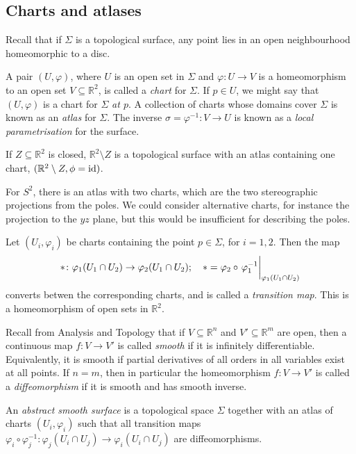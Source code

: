 \subsection{Charts and atlases}
Recall that if \( \Sigma \) is a topological surface, any point lies in an open neighbourhood homeomorphic to a disc.
\begin{definition}
	A pair \( (U, \varphi) \), where \( U \) is an open set in \( \Sigma \) and \( \varphi \colon U \to V \) is a homeomorphism to an open set \( V \subseteq \mathbb R^2 \), is called a \textit{chart} for \( \Sigma \).
	If \( p \in U \), we might say that \( (U, \varphi) \) is a chart for \( \Sigma \) \textit{at \( p \)}.
	A collection of charts whose domains cover \( \Sigma \) is known as an \textit{atlas} for \( \Sigma \).
	The inverse \( \sigma = \varphi^{-1} \colon V \to U \) is known as a \textit{local parametrisation} for the surface.
\end{definition}
\begin{example}
	If \( Z \subseteq \mathbb R^2 \) is closed, \( \mathbb R^2 \setminus Z \) is a topological surface with an atlas containing one chart, \( (\mathbb R^2 \setminus Z, \phi = \operatorname{id}) \).

	For \( S^2 \), there is an atlas with two charts, which are the two stereographic projections from the poles.
	We could consider alternative charts, for instance the projection to the \( yz \) plane, but this would be insufficient for describing the poles.
\end{example}
\begin{definition}
	Let \( (U_i, \varphi_i) \) be charts containing the point \( p \in \Sigma \), for \( i = 1, 2 \).
	Then the map
	\[
		\ast \colon \varphi_1(U_1 \cap U_2) \to \varphi_2(U_1 \cap U_2);\quad \ast = \varphi_2 \circ \eval{\varphi_1^{-1}}_{\varphi_1(U_1 \cap U_2)}
	\]
	converts betwen the corresponding charts, and is called a \textit{transition map}.
	This is a homeomorphism of open sets in \( \mathbb R^2 \).
\end{definition}
Recall from Analysis and Topology that if \( V \subseteq \mathbb R^n \) and \( V' \subseteq \mathbb R^m \) are open, then a continuous map \( f \colon V \to V' \) is called \textit{smooth} if it is infinitely differentiable.
Equivalently, it is smooth if partial derivatives of all orders in all variables exist at all points.
If \( n = m \), then in particular the homeomorphism \( f \colon V \to V' \) is called a \textit{diffeomorphism} if it is smooth and has smooth inverse.
\begin{definition}
	An \textit{abstract smooth surface} is a topological space \( \Sigma \) together with an atlas of charts \( (U_i, \varphi_i) \) such that all transition maps \( \varphi_i \circ \varphi_j^{-1} \colon \varphi_j(U_i \cap U_j) \to \varphi_i(U_i \cap U_j) \) are diffeomorphisms.
\end{definition}
